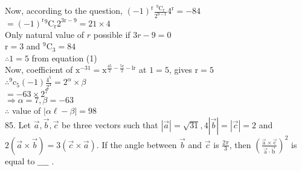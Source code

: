 \documentclass[10pt]{article}
\begin{document}
Now, according to the question, \((-1)^{\mathrm{r}} \frac{{ }^{9} \mathrm{C}_{\mathrm{r}}}{2^{9-\mathrm{r}}} 4^{\mathrm{r}}=-84\)\\
\(=(-1)^{\mathrm{r}}{ }^{9} \mathrm{C}_{\mathrm{r}} 2^{3 \mathrm{r}-9}=21 \times 4\)\\
Only natural value of \(r\) possible if \(3 r-9=0\)\\
\(\mathrm{r}=3\) and \({ }^{9} \mathrm{C}_{3}=84\)\\
\(\therefore 1=5\) from equation (1)\\
Now, coefficient of \(\mathrm{x}^{-31}=\mathrm{x}^{\frac{45}{2}-\frac{5 \mathrm{r}}{2}-\mathrm{lr}}\) at \(1=5\), gives \(\mathrm{r}=5\)\\
\(\therefore{ }^{9} \mathrm{c}_{5}(-1) \frac{4^{5}}{2^{4}}=2^{\alpha} \times \beta\)\\
\(=-63 \times 2^{7}\)\\
\(\Rightarrow \alpha=7, \beta=-63\)\\
\(\therefore\) value of \(|\alpha \ell-\beta|=98\)\\
85. Let \(\vec{a}, \vec{b}, \vec{c}\) be three vectors such that \(|\vec{a}|=\sqrt{31}, 4|\vec{b}|=|\vec{c}|=2\) and \(2(\vec{a} \times \vec{b})=3(\vec{c} \times \vec{a})\). If the angle between \(\vec{b}\) and \(\vec{c}\) is \(\frac{2 \pi}{3}\), then \(\left(\frac{\overrightarrow{\mathrm{a}} \times \overrightarrow{\mathrm{c}}}{\overrightarrow{\mathrm{a}} \cdot \overrightarrow{\mathrm{b}}}\right)^{2}\) is equal to \(\_\_\_\_\) .
\end{document}
